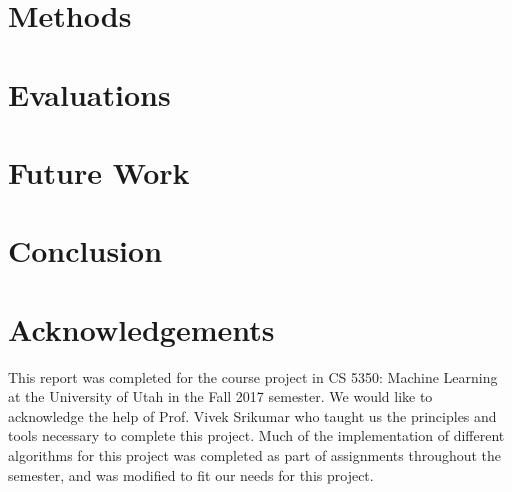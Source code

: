 \section{Methods}

\section{Evaluations}

\section{Future Work}

\section{Conclusion}

\section*{Acknowledgements}
This report was completed for the course project in CS 5350: Machine Learning at the University of Utah in the Fall 2017 semester. We would like to acknowledge the help of Prof. Vivek Srikumar who taught us the principles and tools necessary to complete this project. Much of the implementation of different algorithms for this project was completed as part of assignments throughout the semester, and was modified to fit our needs for this project.
